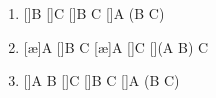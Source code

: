 
\begin{enumerate}
\item
  \begin{prooftree*}
  [\ce]{B}
  [\ce]{C}
  [\ai]{B \land C}
  []{A \to (B \land C)}
  \end{prooftree*}

\item
  \begin{prooftree*}
  \hypo{\Pi}
  [\ae]{A}
  [\ce]{B \to C}
  [\ae]{A}
  [\ce]{C}
  []{(A \land B) \to C}
  \end{prooftree*}

\item
  \begin{prooftree*}
  \hypo{\Pi}
  [\ai]{A \land B}
  [\ce]{C}
  []{B \to C}
  []{A \to (B \to C)}
  \end{prooftree*}
\end{enumerate}
